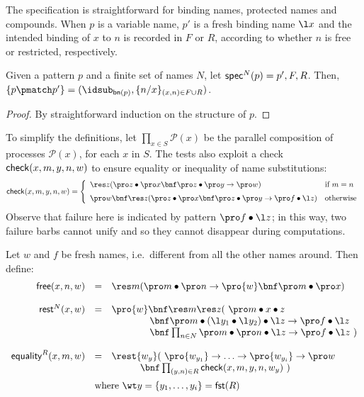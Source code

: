 \documentclass{LMCS}
\begin{document}
\noindent The specification is straightforward for binding names, protected names and compounds.
When $p$ is a variable name, $p'$ is a fresh binding name $\l x$ and the intended binding of $x$ to $n$ 
is recorded in $F$ or $R$, according to whether $n$ is free or restricted, respectively.

\begin{lem}
\label{prop:spec-pp}
Given a pattern $p$ and a finite set of names $N$, let ${\sf spec}^N(p)=p',F,R$.
Then, $\{p\pmatch p'\}=(\idsub_{{\sf bn}(p)},\{n/x\}_{(x,n) \in F \cup R})$.
\end{lem}
\begin{proof}
By straightforward induction on the structure of $p$.
\end{proof}
\enlargethispage{\baselineskip}

To simplify the definitions, let $\prod_{x\in S} {\mathcal P}(x)$ be the parallel composition of 
processes ${\mathcal P}(x)$, for each $x$ in $S$. 
The tests also exploit a check ${\sf check}(x,m,y,n,w)$ to ensure equality or 
inequality of name substitutions:
\[
{\sf check}(x,m,y,n,w) = 
\left\{
\begin{array}{ll}
\res z (\pro z\bullet \pro x\bnf \pro z\bullet \pro y\to \pro w) & \mbox{if }  m=n
\vspace*{.2cm}\\
\pro w\bnf \res z (\pro z\bullet \pro x\bnf \pro z\bullet \pro y\to \pro f\bullet\l z) &\mbox{otherwise}
\end{array}
\right.
\]
Observe that failure here is indicated by pattern $\pro f \bullet \l z$; in this way,
two failure barbs cannot unify and so they cannot disappear during computations.

\begin{defi}[Tests]
Let $w$ and $f$ be fresh names, i.e.\ different from all the other names around. Then define:
\begin{equation*}
\begin{array}{rcl}
{\sf free}(x,n,w) &=& \res m (\pro m\bullet \pro n\to \pro {w}\bnf \pro m\bullet\pro x)
\\
\
\\
{\sf rest}^{N}(x,w) &=& \pro {w}\bnf\res m \res z (\ \pro m\bullet x\bullet z\\
 & & \qquad \qquad \bnf \pro m\bullet (\l y_1\bullet \l y_2)\bullet \l z\to \pro f\bullet \l z 
\\
 & & \qquad \qquad \bnf \prod_{n\in N} \pro m\bullet \pro n\bullet \l z\to \pro f\bullet \l z\ )
\\
\
\\
{\sf equality}^R(x,m,w) &=& \rest {w_y}(\ \pro {w_{y_1}}\to \ldots \to \pro {w_{y_i}} \to \pro w\\
\vspace*{.2cm}& & \qquad\quad\bnf \prod_{(y,n)\in R} {\sf check}(x,m,y,n,w_y)\ )\\
& \multicolumn{2}{l}{\mbox{where $\wt y = \{y_1,\ldots,y_i\}={\sf fst}(R)$}}
\end{array}
\end{equation*}
\end{defi}
\end{document}
